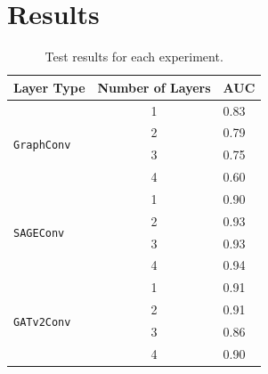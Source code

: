 \documentclass[11pt]{article}
\begin{document}
\section{Results}\label{sec:resutls}

\begin{table}
  \centering
  \begin{tabular}{|l|c|l|} 
  \hline
  \textbf{Layer Type}                  & \multicolumn{1}{l|}{\textbf{Number of Layers}} & \textbf{AUC}  \\ 
  \hline
  \multirow{4}{*}{\texttt{GraphConv }} & 1                                              & 0.83          \\ 
  \cline{2-3}
                                       & 2                                              & 0.79          \\ 
  \cline{2-3}
                                       & 3                                              & 0.75          \\ 
  \cline{2-3}
                                       & 4                                              & 0.60          \\ 
  \hline
  \multirow{4}{*}{\texttt{SAGEConv}}   & 1                                              & 0.90          \\ 
  \cline{2-3}
                                       & 2                                              & 0.93          \\ 
  \cline{2-3}
                                       & 3                                              & 0.93          \\ 
  \cline{2-3}
                                       & 4                                              & 0.94          \\ 
  \hline
  \multirow{4}{*}{\texttt{GATv2Conv}}  & 1                                              & 0.91          \\ 
  \cline{2-3}
                                       & 2                                              & 0.91          \\ 
  \cline{2-3}
                                       & 3                                              & 0.86          \\ 
  \cline{2-3}
                                       & 4                                              & 0.90          \\
  \hline
  \end{tabular}

  \caption{Test results for each experiment.}
  \label{tab:results}
\end{table}
\end{document}
